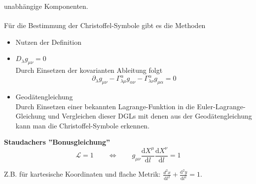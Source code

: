 \documentclass{article}
\newcommand{\diff}{\mathrm{d}}
\begin{document}
unabhängige Komponenten.\\
\\
Für die Bestimmung der Christoffel-Symbole gibt es die Methoden
	\begin{itemize}
		\item Nutzen der Definition
		
		\item $D_\lambda g_{\mu\nu} = 0$\\
		Durch Einsetzen der kovarianten Ableitung folgt
			$$\partial_\lambda g_{\mu\nu} - \Gamma^\alpha_{\lambda\mu}g_{\alpha\nu} - \Gamma^\alpha_{\lambda\nu}g_{\mu\alpha} = 0$$
		
		\item Geodätengleichung\\
		Durch Einsetzen einer bekannten Lagrange-Funktion in die Euler-Lagrange-Gleichung und Vergleichen dieser DGLs mit denen aus der Geodätengleichung kann man die Christoffel-Symbole erkennen.
	\end{itemize}


\textbf{Staudachers ''Bonusgleichung''}
	\begin{equation}
		\mathcal{L} = 1 \qquad\Leftrightarrow\qquad g_{\mu\nu} \frac{\diff X^\mu}{\diff l}\frac{\diff X^\nu}{\diff l} = 1
	\end{equation}

\textcolor{gruen}{Z.B. für kartesische Koordinaten und flache Metrik: $\frac{d^2 x}{\diff l^2} + \frac{\diff^2 y}{\diff l^2} = 1$.}


\newpage


\vspace{0.5cm}
\end{document}
